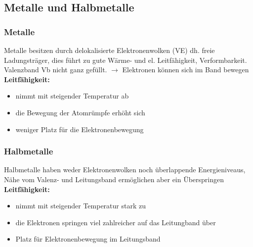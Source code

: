 \subsection{Metalle und Halbmetalle}
 \subsubsection{Metalle}
  Metalle besitzen durch delokalisierte Elektronenwolken (VE) dh. freie Ladungsträger, dies führt zu gute Wärme- und el. Leitfähigkeit, Verformbarkeit. Valenzband Vb nicht ganz gefüllt. \newline
  $\rightarrow$ Elektronen können sich im Band bewegen \newline
  \textbf{Leitfähigkeit:}
	\begin{itemize}
		\item nimmt mit steigender Temperatur ab
		\item die Bewegung der Atomrümpfe erhöht sich
		\item weniger Platz für die Elektronenbewegung
	\end{itemize}
	\smallskip

\subsubsection{Halbmetalle}
 Halbmetalle haben weder Elektronenwolken noch überlappende Energieniveaus, Nähe vom Valenz- und Leitungsband ermöglichen aber ein Überspringen \newline
\textbf{Leitfähigkeit:}
	\begin{itemize}
		\item nimmt mit steigender Temperatur stark zu
		\item die Elektronen springen viel zahlreicher auf das Leitungband über
		\item Platz für Elektronenbewegung im Leitungsband
	\end{itemize}
	
